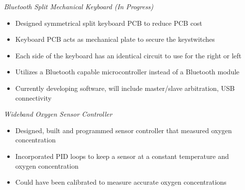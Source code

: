 \documentclass[line,mmmargin]{res}
\begin{document}
\begin{resume}
	{\sl Bluetooth Split Mechanical Keyboard (In Progress)}
		\begin{itemize} \itemsep -2pt
			\item Designed symmetrical split keyboard PCB to reduce PCB cost
			\item Keyboard PCB acts as mechanical plate to secure the keystwitches
			\item Each side of the keyboard has an identical circuit to use for the right or left
			\item Utilizes a Bluetooth capable microcontroller instead of a Bluetooth module
			\item Currently developing software, will include master/slave arbitration, USB connectivity
		\end{itemize}
	\vspace{-10pt}
	{\sl Wideband Oxygen Sensor Controller}
		\begin{itemize} \itemsep -2pt
			\item Designed, built and programmed sensor controller that measured oxygen concentration
			\item Incorporated PID loops to keep a sensor at a constant temperature and oxygen concentration
			\item Could have been calibrated to measure accurate oxygen concentrations
		\end{itemize}


\end{resume}
\end{document}
